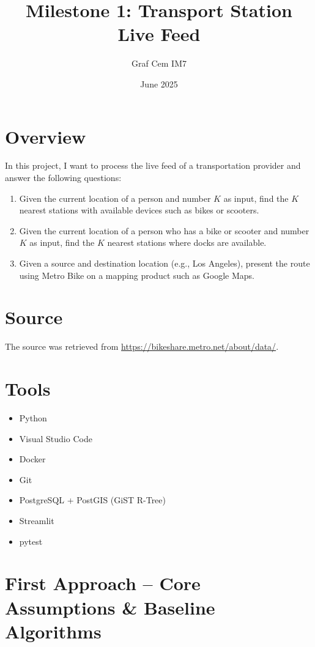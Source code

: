 \documentclass{article}
\title{Milestone 1: Transport Station Live Feed}
\author{Graf Cem IM7}
\date{June 2025}
\begin{document}
\maketitle

\tableofcontents
\clearpage

\section{Overview}
In this project, I want to process the live feed of a transportation provider and answer the following questions:
\begin{enumerate}
    \item Given the current location of a person and number $K$ as input, find the $K$ nearest stations with available devices such as bikes or scooters.
    \item Given the current location of a person who has a bike or scooter and number $K$ as input, find the $K$ nearest stations where docks are available.
    \item Given a source and destination location (e.g., Los Angeles), present the route using Metro Bike on a mapping product such as Google Maps.
\end{enumerate}

\section{Source}
The source was retrieved from \url{https://bikeshare.metro.net/about/data/}.

\section{Tools}
\begin{itemize}
  \item Python
  \item Visual Studio Code
  \item Docker
  \item Git
  \item PostgreSQL + PostGIS (GiST R-Tree)
  \item Streamlit
  \item pytest
\end{itemize}

\section{First Approach -- Core Assumptions \& Baseline Algorithms}
\end{document}
